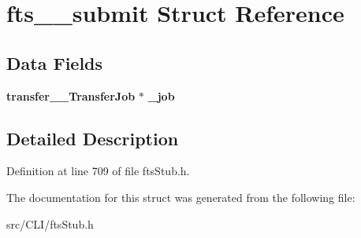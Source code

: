 \section{fts\_\-\_\-submit Struct Reference}
\label{structfts____submit}
\subsection*{Data Fields}
\begin{DoxyCompactItemize}
\item 
{\bf transfer\_\-\_\-TransferJob} $\ast$ {\bfseries \_\-job}\label{structfts____submit_a71502c7284170559154dd9037990c13a}

\end{DoxyCompactItemize}


\subsection{Detailed Description}


Definition at line 709 of file ftsStub.h.



The documentation for this struct was generated from the following file:\begin{DoxyCompactItemize}
\item 
src/CLI/ftsStub.h\end{DoxyCompactItemize}
